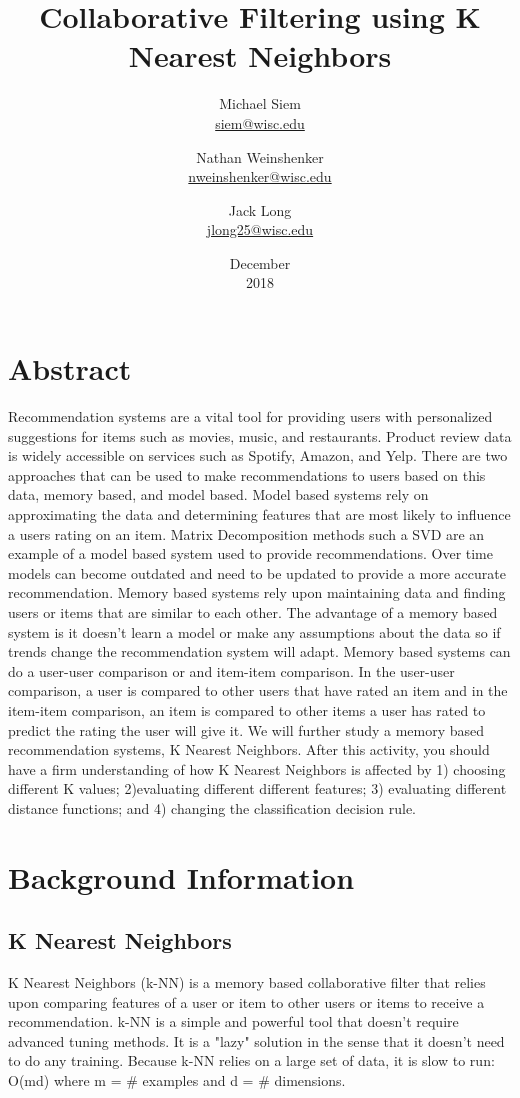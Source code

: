 \documentclass{report}
\title{Collaborative Filtering using K Nearest Neighbors}
\date{December\\ 2018}
\author{Michael Siem \\ \href{mailto:siem@wisc.edu}{siem@wisc.edu}
	\and Nathan Weinshenker \\ \href{mailto:nweinshenker@wisc.edu}{nweinshenker@wisc.edu}
	\and Jack Long \\ \href{mailto:jlong25@wisc.edu}{jlong25@wisc.edu}}
\begin{document}
\maketitle

\chapter*{Abstract}
Recommendation systems are a vital tool for providing users with personalized suggestions for items such as movies, music, and restaurants.
Product review data is widely accessible on services such as Spotify, Amazon, and Yelp.
There are two approaches that can be used to make recommendations to users based on this data, memory based, and model based.
Model based systems rely on approximating the data and determining features that are most likely to influence a users rating on an item. 
Matrix Decomposition methods such a SVD are an example of a model based system used to provide recommendations.
Over time models can become outdated and need to be updated to provide a more accurate recommendation.
Memory based systems rely upon maintaining data and finding users or items that are similar to each other.
The advantage of a memory based system is it doesn't learn a model or make any assumptions about the data so if trends change the recommendation system will adapt.
Memory based systems can do a user-user comparison or and item-item comparison.
In the user-user comparison, a user is compared to other users that have rated an item and in the item-item comparison, an item is compared to other items a user has rated to predict the rating the user will give it.
We will further study a memory based recommendation systems, K Nearest Neighbors. After this activity, you should have a firm understanding of how K Nearest Neighbors is affected by 1) choosing different K values; 2)evaluating different different features; 3) evaluating different distance functions; and 4) changing the classification decision rule.

\chapter*{Background Information}
	
\section*{K Nearest Neighbors}
	
K Nearest Neighbors (k-NN) is a memory based collaborative filter that relies upon comparing features of a user or item to other users or items to receive a recommendation. 
k-NN is a simple and powerful tool that doesn't require advanced tuning methods. 
It is a "lazy" solution in the sense that it doesn't need to do any training\cite{1}.
Because k-NN relies on a large set of data, it is slow to run: O(md) where m = \# examples and d = \# dimensions.
\end{document}
